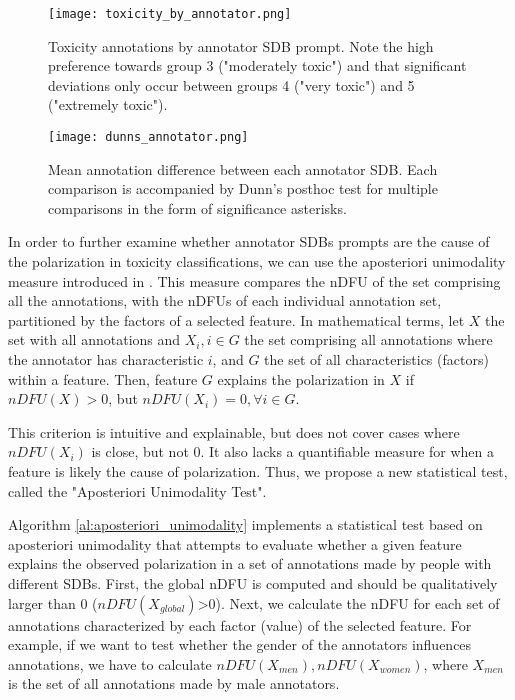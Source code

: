 \begin{figure}
	\centering
	\texttt{[image: toxicity\_by\_annotator.png]}
	\caption{Toxicity annotations by annotator \ac{SDB} prompt. Note the high preference towards group 3 ("moderately toxic") and that significant deviations only occur between groups 4 ("very toxic") and 5 ("extremely toxic").}
	\label{fig::toxicity-annotator}
\end{figure}

\begin{figure}
	\centering
	\texttt{[image: dunns\_annotator.png]}
	\caption{Mean annotation difference between each annotator \ac{SDB}. Each comparison is accompanied by Dunn's posthoc test for multiple comparisons in the form of significance asterisks.}
	\label{fig::toxicity-annotator-significance}
\end{figure}

In order to further examine whether annotator \acp{SDB} prompts are the cause of the polarization in toxicity classifications, we can use the aposteriori unimodality measure introduced in \citet{pavlopoulos-likas-2024-polarized}. This measure compares the \ac{nDFU} of the set comprising all the annotations, with the \acp{nDFU} of each individual annotation set, partitioned by the factors of a selected feature. In mathematical terms, let $X$ the set with all annotations and $X_i, i \in G$ the set comprising all annotations where the annotator has characteristic $i$, and $G$ the set of all characteristics (factors) within a feature. Then, feature $G$ explains the polarization in $X$ if $nDFU(X) > 0$, but $nDFU(X_i) = 0, \forall i \in G$. 

This criterion is intuitive and explainable, but does not cover cases where $nDFU(X_i)$ is close, but not $0$. It also lacks a quantifiable measure for when a feature is likely the cause of polarization. Thus, we propose a new statistical test, called the "Aposteriori Unimodality Test". 

Algorithm \ref{al:aposteriori_unimodality} implements a statistical test based on aposteriori unimodality that attempts to evaluate whether a given feature explains the observed polarization in a set of annotations made by people with different \acp{SDB}. First, the global \ac{nDFU} is computed and should be qualitatively larger than $0$ ($nDFU(X_{global}) \text{>} 0$). Next, we calculate the \ac{nDFU} for each set of annotations characterized by each factor (value) of the selected feature. For example, if we want to test whether the gender of the annotators influences annotations, we have to calculate $nDFU(X_{men}), nDFU(X_{women})$, where $X_{men}$ is the set of all annotations made by male annotators. 

